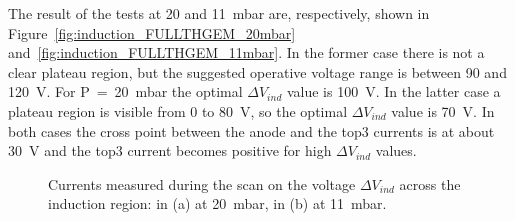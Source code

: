 \documentclass[a4paper, 11 pt]{article}
\newcommand{\Vind}{$\Delta V_{ind}$}
\begin{document}
The result of the tests at 20 and 11~mbar are, respectively, shown in Figure~\ref{fig:induction_FULLTHGEM_20mbar} and~\ref{fig:induction_FULLTHGEM_11mbar}.
In the former case there is not a clear plateau region, but the suggested operative voltage range is between 90 and 120~V.
For P~=~20~mbar the optimal \Vind{} value is 100~V.
In the latter case a plateau region is visible from 0 to 80~V, so the optimal \Vind{} value is 70~V.
In both cases the cross point between the anode and the top3 currents is at about 30~V and the top3 current becomes positive for high \Vind{} values.



\begin{figure}[!htb]
	\centering
	\caption{Currents measured during the scan on the voltage \Vind{} across the induction region: in (a) at 20~mbar, in (b) at 11~mbar.}
	\label{fig:induction_FULLTHGEM_other_pressure}
\end{figure}
\end{document}
